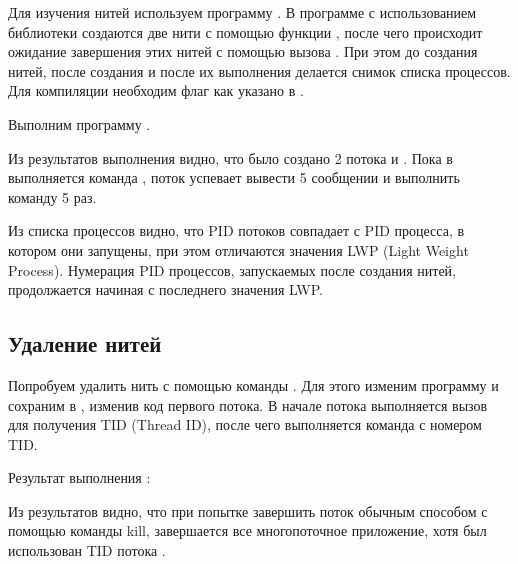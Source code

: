 Для изучения нитей используем программу . В программе с использованием библиотеки  создаются две нити с помощью функции , после чего происходит ожидание завершения этих нитей с помощью вызова . При этом до создания нитей, после создания и после их выполнения делается снимок списка процессов. Для компиляции необходим флаг  как указано в .





Выполним программу .



Из результатов выполнения видно, что было создано 2 потока  и . Пока в  выполняется команда , поток  успевает вывести 5 сообщении и выполнить команду  5 раз.







Из списка процессов видно, что PID потоков совпадает с PID процесса, в котором они запущены, при этом отличаются значения LWP (Light Weight Process). Нумерация PID процессов, запускаемых после создания нитей, продолжается начиная с последнего значения LWP.

\subsection{Удаление нитей}

Попробуем удалить нить с помощью команды . Для этого изменим программу  и сохраним в , изменив код первого потока. В начале потока выполняется вызов  для получения TID (Thread ID), после чего выполняется команда  с номером TID.



Результат выполнения :



Из результатов видно, что при попытке завершить поток обычным способом с помощью команды kill, завершается все многопоточное приложение, хотя был использован TID потока .

